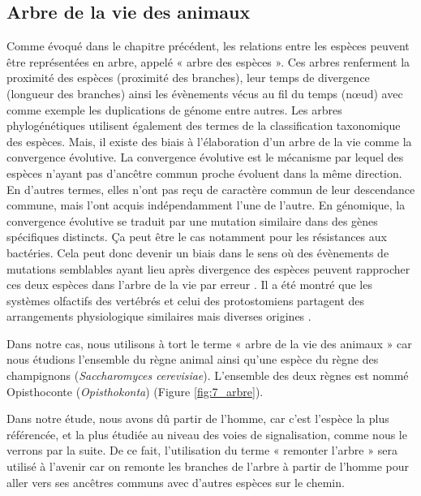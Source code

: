 \subsection{Arbre de la vie des animaux}\label{tree}
\par Comme évoqué dans le chapitre précédent, les relations entre les espèces peuvent être représentées en arbre, appelé « arbre des espèces ». Ces arbres renferment la proximité des espèces (proximité des branches), leur temps de divergence (longueur des branches) ainsi les évènements vécus au fil du temps (nœud) avec comme exemple les duplications de génome entre autres. Les arbres phylogénétiques utilisent également des termes de la classification taxonomique des espèces. 
Mais, il existe des biais à l’élaboration d’un arbre de la vie comme la convergence évolutive. La convergence évolutive est le mécanisme par lequel des espèces n’ayant pas d’ancêtre commun proche évoluent dans la même direction. En d’autres termes, elles n’ont pas reçu de caractère commun de leur descendance commune, mais l’ont acquis indépendamment l’une de l’autre. En génomique, la convergence évolutive se traduit par une mutation similaire dans des gènes spécifiques distincts. Ça peut être le cas notamment pour les résistances aux bactéries. Cela peut donc devenir un biais dans le sens où des évènements de mutations semblables ayant lieu après divergence des espèces peuvent rapprocher ces deux espèces dans l’arbre de la vie par erreur \parencite{christin_causes_2010}. Il a été montré que les systèmes olfactifs des vertébrés et celui des protostomiens partagent des arrangements physiologique similaires \parencite{hildebrand_mechanisms_1997} mais diverses origines \parencite{strausfeld_olfactory_1999}.
\par Dans notre cas, nous utilisons à tort le terme « arbre de la vie des animaux » car nous étudions l’ensemble du règne animal ainsi qu’une espèce du règne des champignons (\textit{Saccharomyces cerevisiae}). L’ensemble des deux règnes est nommé Opisthoconte (\textit{Opisthokonta}) (Figure \ref{fig:7_arbre}). 
\par Dans notre étude, nous avons dû partir de l’homme, car c’est l’espèce la plus référencée, et la plus étudiée au niveau des voies de signalisation, comme nous le verrons par la suite. De ce fait, l’utilisation du terme « remonter l’arbre » sera utilisé à l’avenir car on remonte les branches de l’arbre à partir de l’homme pour aller vers ses ancêtres communs avec d’autres espèces sur le chemin. 
